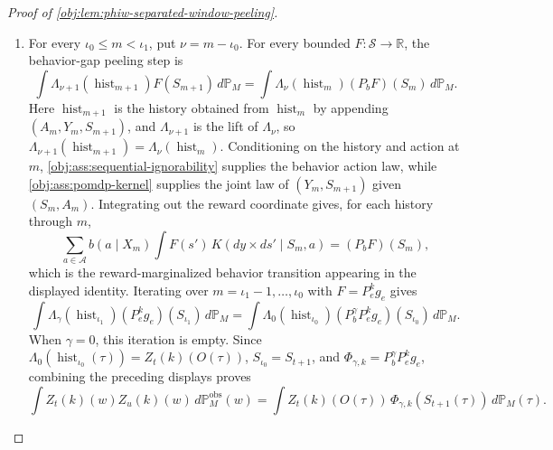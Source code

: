 \begin{proof}[Proof of \cref{obj:lem:phiw-separated-window-peeling}]
\begin{enumerate}
\item For every \(\iota_0\le m<\iota_1\), put \(\nu=m-\iota_0\).  For every bounded \(F:\mathcal S\to\mathbb R\), the behavior-gap peeling step is
\[
\int
\Lambda_{\nu+1}(\operatorname{hist}_{m+1})F(S_{m+1})\,d\mathbb P_M
=
\int
\Lambda_{\nu}(\operatorname{hist}_{m})(P_bF)(S_m)\,d\mathbb P_M .
\]
Here \(\operatorname{hist}_{m+1}\) is the history obtained from \(\operatorname{hist}_m\) by appending
\((A_m,Y_m,S_{m+1})\), and \(\Lambda_{\nu+1}\) is the lift of \(\Lambda_\nu\), so
\(\Lambda_{\nu+1}(\operatorname{hist}_{m+1})=\Lambda_\nu(\operatorname{hist}_m)\). Conditioning on the history and action at \(m\), \cref{obj:ass:sequential-ignorability} supplies the behavior action law, while \cref{obj:ass:pomdp-kernel} supplies the joint law of \((Y_m,S_{m+1})\) given \((S_m,A_m)\).  Integrating out the reward coordinate gives, for each history through \(m\),
\[
\sum_{a\in\mathcal A} b(a\mid X_m)
\int F(s')\,K(dy\times ds'\mid S_m,a)
=
(P_bF)(S_m),
\]
which is the reward-marginalized behavior transition appearing in the displayed identity.  Iterating over \(m=\iota_1-1,\ldots,\iota_0\) with \(F=P_e^kg_e\) gives
\[
\int
\Lambda_{\gamma}(\operatorname{hist}_{\iota_1})(P_e^kg_e)(S_{\iota_1})\,d\mathbb P_M
=
\int
\Lambda_{0}(\operatorname{hist}_{\iota_0})
(P_b^\gamma P_e^kg_e)(S_{\iota_0})\,d\mathbb P_M .
\]
When \(\gamma=0\), this iteration is empty.  Since \(\Lambda_0(\operatorname{hist}_{\iota_0}(\tau))=Z_t(k)(O(\tau))\), \(S_{\iota_0}=S_{t+1}\), and \(\Phi_{\gamma,k}=P_b^\gamma P_e^kg_e\), combining the preceding displays proves
\[
\int Z_t(k)(w)Z_u(k)(w)\,d\mathbb P_M^{\mathrm{obs}}(w)
=
\int Z_t(k)(O(\tau))\,\Phi_{\gamma,k}(S_{t+1}(\tau))\,d\mathbb P_M(\tau).
\]
\end{enumerate}
\end{proof}
